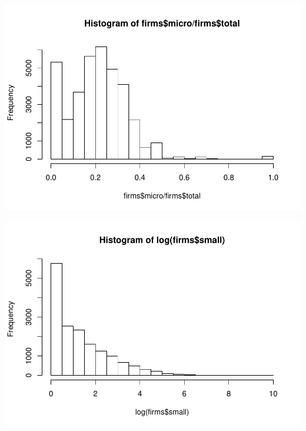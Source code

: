 \documentclass[]{article}
\newenvironment{Shaded}{\begin{snugshade}}{\end{snugshade}}
\newcommand{\KeywordTok}[1]{\textcolor[rgb]{0.13,0.29,0.53}{\textbf{#1}}}
\newcommand{\OperatorTok}[1]{\textcolor[rgb]{0.81,0.36,0.00}{\textbf{#1}}}
\newcommand{\NormalTok}[1]{#1}
\begin{document}
\begin{Shaded}
\end{Shaded}

\includegraphics{TSLproject_files/figure-latex/unnamed-chunk-7-5.pdf}

\begin{Shaded}
\end{Shaded}

\includegraphics{TSLproject_files/figure-latex/unnamed-chunk-7-6.pdf}
\end{document}
